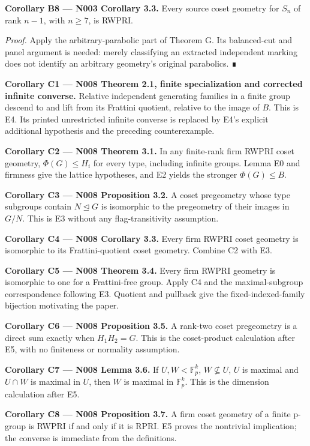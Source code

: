 \documentclass[
  10pt,
  letterpaper,
]{article}
\begin{document}
\textbf{Corollary B8 --- N003 Corollary 3.3.} Every source coset
geometry for \(S_n\) of rank \(n-1\), with \(n\geq7\), is RWPRI.

\emph{Proof.} Apply the arbitrary-parabolic part of Theorem G. Its
balanced-cut and panel argument is needed: merely classifying an
extracted independent marking does not identify an arbitrary geometry's
original parabolics. ∎

\textbf{Corollary C1 --- N008 Theorem 2.1, finite specialization and
corrected infinite converse.} Relative independent generating families
in a finite group descend to and lift from its Frattini quotient,
relative to the image of \(B\). This is E4. Its printed unrestricted
infinite converse is replaced by E4's explicit additional hypothesis and
the preceding counterexample.

\textbf{Corollary C2 --- N008 Theorem 3.1.} In any finite-rank firm
RWPRI coset geometry, \(\Phi(G)\leq H_i\) for every type, including
infinite groups. Lemma E0 and firmness give the lattice hypotheses, and
E2 yields the stronger \(\Phi(G)\leq B\).

\textbf{Corollary C3 --- N008 Proposition 3.2.} A coset pregeometry
whose type subgroups contain \(N\unlhd G\) is isomorphic to the
pregeometry of their images in \(G/N\). This is E3 without any
flag-transitivity assumption.

\textbf{Corollary C4 --- N008 Corollary 3.3.} Every firm RWPRI coset
geometry is isomorphic to its Frattini-quotient coset geometry. Combine
C2 with E3.

\textbf{Corollary C5 --- N008 Theorem 3.4.} Every firm RWPRI geometry is
isomorphic to one for a Frattini-free group. Apply C4 and the
maximal-subgroup correspondence following E3. Quotient and pullback give
the fixed-indexed-family bijection motivating the paper.

\textbf{Corollary C6 --- N008 Proposition 3.5.} A rank-two coset
pregeometry is a direct sum exactly when \(H_1H_2=G\). This is the
coset-product calculation after E5, with no finiteness or normality
assumption.

\textbf{Corollary C7 --- N008 Lemma 3.6.} If \(U,W<\mathbb F_p^k\),
\(W\not\subseteq U\), \(U\) is maximal and \(U\cap W\) is maximal in
\(U\), then \(W\) is maximal in \(\mathbb F_p^k\). This is the dimension
calculation after E5.

\textbf{Corollary C8 --- N008 Proposition 3.7.} A firm coset geometry of
a finite p-group is RWPRI if and only if it is RPRI. E5 proves the
nontrivial implication; the converse is immediate from the definitions.
\end{document}
